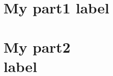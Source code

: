 \documentclass[12pt, a4paper
,openany
]{Thesis} %
\begin{document}
\mainmatter %

\pagestyle{fancy} %





\part{My part1 label}
\label{part:part1}
 





\part[My part2 contents label]{My part2\\ label}
\label{part:part2}




\clearpage %




% 
% 
% 
%


\backmatter

\end{document}
